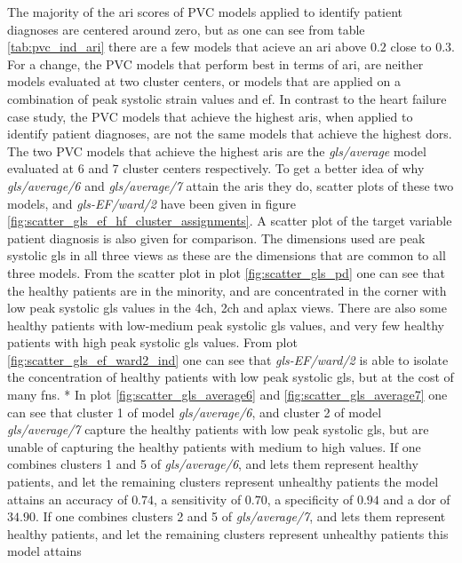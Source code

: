 The majority of the \acrshort{ari} scores of PVC models applied to identify patient diagnoses are centered around zero, but as one can see from table \ref{tab:pvc_ind_ari}
there are a few models that acieve an \acrshort{ari} above $0.2$ close to $0.3$.
For a change, the PVC models that perform best in terms of \acrshort{ari}, are neither models evaluated at two cluster centers, or models that are applied on a combination
of peak systolic strain values and \acrshort{ef}.
In contrast to the heart failure case study, the PVC models that achieve the highest \acrshort{ari}s, when applied to identify patient diagnoses, are not the same models that achieve the 
highest \acrshort{dor}s.
The two PVC models that achieve the highest \acrshort{ari}s are the \textit{gls/average} model evaluated at 6 and 7 cluster centers respectively. 
To get a better idea of why \textit{gls/average/6} and \textit{gls/average/7} attain the \acrshort{ari}s they do, scatter plots of these two models, and \textit{gls-EF/ward/2}
have been given in figure \ref{fig:scatter_gls_ef_hf_cluster_assignments}. A scatter plot of the target variable patient diagnosis is also given for comparison.
The dimensions used are peak systolic \acrshort{gls} in all three views as these are the dimensions that are common to all three models.
From the scatter plot in plot \ref{fig:scatter_gls_pd} one can see that the healthy patients are in the minority, and are concentrated in the corner 
with low peak systolic \acrshort{gls} values in the \acrshort{4ch}, \acrshort{2ch} and \acrshort{aplax} views. 
There are also some healthy patients with low-medium peak systolic \acrshort{gls} values, and very few healthy patients with high peak systolic \acrshort{gls} values.
From plot \ref{fig:scatter_gls_ef_ward2_ind} one can see that \textit{gls-EF/ward/2} is able to isolate the concentration of healthy patients with low peak systolic \acrshort{gls}, 
but at the cost of many \acrshort{fn}s.
* In plot \ref{fig:scatter_gls_average6} and \ref{fig:scatter_gls_average7} one can see that cluster 1 of model \textit{gls/average/6}, 
and cluster 2 of model \textit{gls/average/7} capture the healthy patients with low peak systolic \acrshort{gls}, but are unable of capturing the healthy patients with
medium to high values.
If one combines clusters 1 and 5 of \textit{gls/average/6}, and lets them represent healthy patients, and let the remaining clusters represent unhealthy patients the model attains 
an accuracy of $0.74$, a sensitivity of $0.70$, a specificity of $0.94$ and a \acrshort{dor} of $34.90$.
If one combines clusters 2 and 5 of \textit{gls/average/7}, and lets them represent healthy patients, and let the remaining clusters represent unhealthy patients this model attains 

